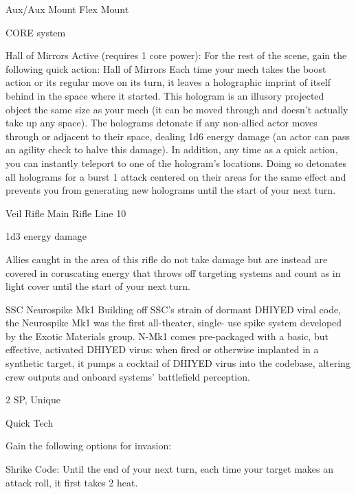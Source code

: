   Aux/Aux Mount                      Flex Mount 

                                                  CORE system 

                                                                                                               


                                                  Hall of Mirrors 
  Active (requires 1 core power): For the rest of the scene, gain the following quick action: 
  Hall of Mirrors 
  Each time your mech takes the boost action or its regular move on its turn, it leaves a holographic 
  imprint of itself behind in the space where it started. This hologram is an illusory projected object the 
  same size as your mech (it can be moved through and doesn’t actually take up any space). The 
  holograms detonate if any non-allied actor moves through or adjacent to their space, dealing 1d6 
  energy damage (an actor can pass an agility check to halve this damage). In addition, any time as a 
  quick action, you can instantly teleport to one of the hologram’s locations. Doing so detonates all 
  holograms for a burst 1 attack centered on their areas for the same effect and prevents you from 
  generating new holograms until the start of your next turn. 

Veil Rifle  
Main Rifle  
Line 10
 
1d3 energy damage
 
Allies caught in the area of this rifle do not take damage but are instead are covered in  
coruscating energy that throws off targeting systems and count as in light cover until the start of  
your next turn.
 

SSC Neurospike Mk1  
Building off SSC’s strain of dormant DHIYED viral code, the Neurospike Mk1 was the first all-theater, single- 
use spike system developed by the Exotic Materials group. N-Mk1 comes pre-packaged with a basic, but  
effective, activated DHIYED virus: when fired or otherwise implanted in a synthetic target, it pumps a  
cocktail of DHIYED virus into the codebase, altering crew outputs and onboard systems’ battlefield  
perception.    

2 SP, Unique
 
Quick Tech
 
Gain the following options for invasion:
 
         Shrike Code: Until the end of your next turn, each time your target makes an attack roll,  
         it first takes 2 heat.
 
